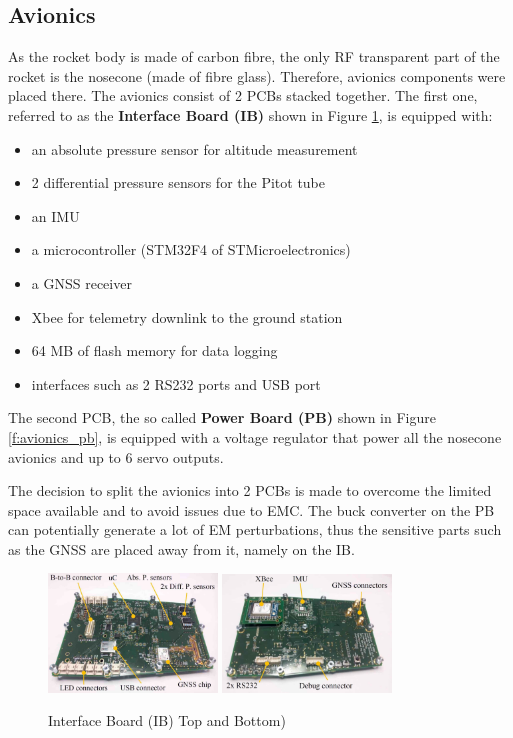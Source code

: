 \subsection{Avionics}
As the rocket body is made of carbon fibre, the only RF transparent part of the rocket is the nosecone (made of fibre glass). Therefore, avionics components were placed there. The avionics consist of 2 PCBs stacked together. The first one, referred to as the \textbf{Interface Board (IB)} shown in Figure \ref{f:avionics_ib}, is equipped with:
\begin{itemize}[noitemsep]
    \item an absolute pressure sensor for altitude measurement
    \item 2 differential pressure sensors for the Pitot tube
    \item an IMU
    \item a microcontroller (STM32F4 of STMicroelectronics)
    \item a GNSS receiver
    \item Xbee for telemetry downlink to the ground station
    \item 64 MB of flash memory for data logging
    \item interfaces such as 2 RS232 ports and USB port
\end{itemize}

The second PCB, the so called \textbf{Power Board (PB)}  shown in Figure \ref{f:avionics_pb}, is equipped with a voltage regulator that power all the nosecone avionics and up to 6 servo outputs.

The decision to split the avionics into 2 PCBs is made to overcome the limited space available and to avoid issues due to EMC. The buck converter on the PB can potentially generate a lot of EM perturbations, thus the sensitive parts such as the GNSS are placed away from it, namely on the IB.

 \begin{figure}[h!]
 	\centering
        \includegraphics[width=0.40\textwidth]{img/AV_FIG_IB_top.jpg}
          \includegraphics[width=0.40\textwidth]{img/AV_FIG_IB_bottom.jpg}
        \caption{Interface Board (IB) Top and Bottom)}
        \label{f:avionics_ib}
 \end{figure}
 

